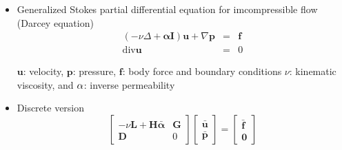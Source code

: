 \documentclass[dvips,landscape]{foils}
\begin{document}
\begin{itemize}
\item Generalized Stokes partial differential equation for imcompressible flow (Darcey equation)
       \begin{eqnarray*}
       ( -\nu\Delta + \mathbf{\alpha} \mathbf{I}) \mathbf{u} +\nabla  \mathbf{p} & = & \mathbf{f}\\
       \text{div} \mathbf{u}& = & 0
       \end{eqnarray*}

       $\mathbf{u}$: velocity, $\mathbf{p}$: pressure, $\mathbf{f}$: body force and boundary conditions
       $\nu$: kinematic viscosity, and $\bf{\alpha}$: inverse permeability
\item Discrete version
       \begin{equation}
       \left[\begin{matrix}
       -\nu \mathbf{L} + \mathbf{H} \mathbf{\bar{\alpha}}  & \mathbf{G}\\
       \mathbf{D}               &  0
       \end{matrix} \right]
    \left[\begin{matrix}
    \mathbf{\bar{u}} \\ \mathbf{\bar{p}}
    \end{matrix} \right]=
    \left[\begin{matrix}
    \mathbf{\bar{f}} \\ \mathbf{0}
    \end{matrix} \right]
    \end{equation}
\end{itemize}
\end{document}
